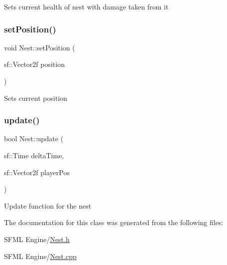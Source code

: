 Sets current health of nest with damage taken from it \mbox{\label{class_nest_a483c559f957838c28d613fddad8b99f3}} 
\subsubsection{\texorpdfstring{set\+Position()}{setPosition()}}
{\footnotesize\ttfamily void Nest\+::set\+Position (\begin{DoxyParamCaption}\item[{sf\+::\+Vector2f}]{position }\end{DoxyParamCaption})}

Sets current position \mbox{\label{class_nest_a90efe6e30a891f7dd0620d4f14c3cef6}} 
\subsubsection{\texorpdfstring{update()}{update()}}
{\footnotesize\ttfamily bool Nest\+::update (\begin{DoxyParamCaption}\item[{sf\+::\+Time}]{delta\+Time,  }\item[{sf\+::\+Vector2f}]{player\+Pos }\end{DoxyParamCaption})}

Update function for the nest 

The documentation for this class was generated from the following files\+:\begin{DoxyCompactItemize}
\item 
S\+F\+M\+L Engine/\hyperlink{_nest_8h}{Nest.\+h}\item 
S\+F\+M\+L Engine/\hyperlink{_nest_8cpp}{Nest.\+cpp}\end{DoxyCompactItemize}
